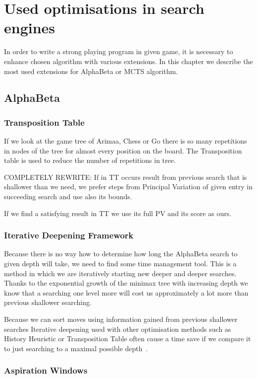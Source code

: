 \chapter{Used optimisations in search engines}

In order to write a strong playing program in given game, it is necessary to
enhance chosen algorithm with various extensions. In this chapter we describe
the most used extensions for AlphaBeta or MCTS algorithm.

\section{AlphaBeta}
\subsection{Transposition Table}\label{AlphaBeta:TT}
If we look at the game tree of Arimaa, Chess or Go there is so many repetitions in
nodes of the tree for almost every position on the board. The Transposition table
is used to reduce the number of repetitions in tree.

COMPLETELY REWRITE: If in TT occurs result from previous search that is
shallower than we need, we prefer steps from Principal Variation of given entry
in succeeding search and use also its bounds.

If we find a satisfying result in TT we use its full PV and its score as ours.

\subsection{Iterative Deepening Framework}
Because there is no way how to determine how long the AlphaBeta search to
given depth will take, we need to find some time management tool. This is a
method in which we are iteratively starting new deeper and deeper searches.
Thanks to the exponential growth of the minimax tree with increasing depth we
know that a searching one level more will cost us approximately a lot more than
previous shallower searching.

Because we can sort moves using information gained from previous shallower
searches Iterative deepening used with other optimisation methods such as
History Heuristic or Transposition Table often cause a time save if we compare
it to just searching to a maximal possible depth~\cite{COX}.

\subsection{Aspiration Windows}

